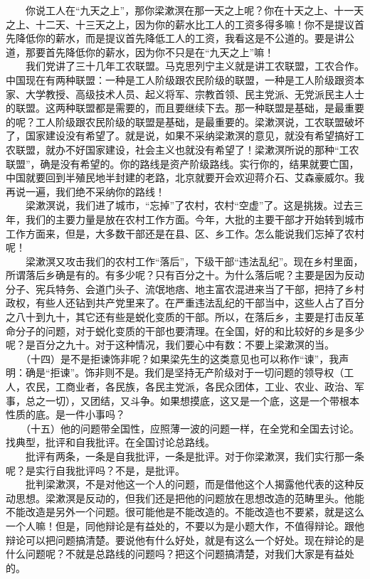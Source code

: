 \documentclass[cn,11pt,chinese]{elegantbook}
\begin{document}
　　你说工人在“九天之上”，那你梁漱溟在那一天之上呢？你在十天之上、十一天之上、十二天、十三天之上，因为你的薪水比工人的工资多得多嘛！你不是提议首先降低你的薪水，而是提议首先降低工人的工资，我看这是不公道的。要是讲公道，那要首先降低你的薪水，因为你不只是在“九天之上”嘛！\\
　　我们党讲了三十几年工农联盟。马克思列宁主义就是讲工农联盟，工农合作。中国现在有两种联盟：一种是工人阶级跟农民阶级的联盟，一种是工人阶级跟资本家、大学教授、高级技术人员、起义将军、宗教首领、民主党派、无党派民主人士的联盟。这两种联盟都是需要的，而且要继续下去。那一种联盟是基础，是最重要的呢？工人阶级跟农民阶级的联盟是基础，是最重要的。梁漱溟说，工农联盟破坏了，国家建设没有希望了。就是说，如果不采纳梁漱溟的意见，就没有希望搞好工农联盟，就办不好国家建设，社会主义也就没有希望了！梁漱溟所说的那种“工农联盟”，确是没有希望的。你的路线是资产阶级路线。实行你的，结果就要亡国，中国就要回到半殖民地半封建的老路，北京就要开会欢迎蒋介石、艾森豪威尔。我再说一遍，我们绝不采纳你的路线！\\
　　梁漱溟说，我们进了城市，“忘掉”了农村，农村“空虚”了。这是挑拨。过去三年，我们的主要力量是放在农村工作方面。今年，大批的主要干部才开始转到城市工作方面来，但是，大多数干部还是在县、区、乡工作。怎么能说我们忘掉了农村呢！\\
　　梁漱溟又攻击我们的农村工作“落后”，下级干部“违法乱纪”。现在乡村里面，所谓落后乡确是有的。有多少呢？只有百分之十。为什么落后呢？主要是因为反动分子、宪兵特务、会道门头子、流氓地痞、地主富农混进来当了干部，把持了乡村政权，有些人还钻到共产党里来了。在严重违法乱纪的干部当中，这些人占了百分之八十到九十，其它还有些是蜕化变质的干部。所以，在落后乡，主要是打击反革命分子的问题，对于蜕化变质的干部也要清理。在全国，好的和比较好的乡是多少呢？是百分之九十。对于这种情况，我们要心中有数：不要上梁漱溟的当。\\
　　（十四）是不是拒谏饰非呢？如果梁先生的这类意见也可以称作“谏”，我声明：确是“拒谏”。饰非则不是。我们是坚持无产阶级对于一切问题的领导权（工人，农民，工商业者，各民族，各民主党派，各民众团体，工业、农业、政治、军事，总之一切），又团结，又斗争。如果想摸底，这又是一个底，这是一个带根本性质的底。是一件小事吗？\\
　　（十五）他的问题带全国性，应照薄一波的问题一样，在全党和全国去讨论。找典型，批评和自我批评。在全国讨论总路线。\\
　　批评有两条，一条是自我批评，一条是批评。对于你梁漱溟，我们实行那一条呢？是实行自我批评吗？不是，是批评。\\
　　批判梁漱溟，不是对他这一个人的问题，而是借他这个人揭露他代表的这种反动思想。梁漱溟是反动的，但我们还是把他的问题放在思想改造的范畴里头。他能不能改造是另外一个问题。很可能他是不能改造的。不能改造也不要紧，就是这么一个人嘛！但是，同他辩论是有益处的，不要以为是小题大作，不值得辩论。跟他辩论可以把问题搞清楚。要说他有什么好处，就是有这么一个好处。现在辩论的是什么问题呢？不就是总路线的问题吗？把这个问题搞清楚，对我们大家是有益处的。\\
\end{document}

